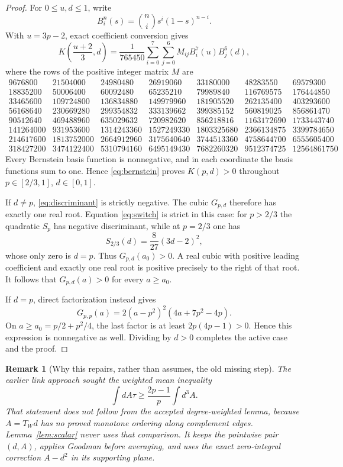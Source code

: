 \documentclass[11pt]{article}
\newtheorem{remark}[theorem]{Remark}
\begin{document}
\begin{proof}
For $0\leq u,d\leq1$, write
\[
 B_i^n(s)=\binom ni s^i(1-s)^{n-i}.
\]
With $u=3p-2$, exact coefficient conversion gives
\begin{equation}
 K\!\left(\frac{u+2}{3},d\right)
 =\frac1{765450}\sum_{i=0}^7\sum_{j=0}^6
 M_{ij}B_i^7(u)B_j^6(d),
 \label{eq:bernstein}
\end{equation}
where the rows of the positive integer matrix $M$ are
\[
\begin{array}{rrrrrrr}
9676800&21504000&24980480&26919060&33180000&48283550&69579300\\
18835200&50006400&60092480&65235210&79989840&116769575&176444850\\
33465600&109724800&136834880&149979960&181905520&262135400&403293600\\
56168640&230669280&299354832&333139662&399385152&560819025&856861470\\
90512640&469488960&635029632&720982620&856218816&1163172690&1733443740\\
141264000&931953600&1314243360&1527249330&1803325680&2366134875&3399784650\\
214617600&1813752000&2664912960&3175640640&3744513360&4758644700&6555605400\\
318427200&3474122400&5310794160&6495149430&7682260320&9512374725&12564861750
\end{array}
\]
Every Bernstein basis function is nonnegative, and in each coordinate the
basis functions sum to one.  Hence \eqref{eq:bernstein} proves
$K(p,d)>0$ throughout $p\in[2/3,1]$, $d\in[0,1]$.

If $d\ne p$, \eqref{eq:discriminant} is strictly negative.  The cubic
$G_{p,d}$ therefore has exactly one real root.  Equation \eqref{eq:switch}
is strict in this case: for $p>2/3$ the quadratic $S_p$ has negative
discriminant, while at $p=2/3$ one has
\[
 S_{2/3}(d)=\frac8{27}(3d-2)^2,
\]
whose only zero is $d=p$.  Thus $G_{p,d}(a_0)>0$.  A real cubic with positive
leading coefficient and exactly one real root is positive precisely to the
right of that root.  It follows that $G_{p,d}(a)>0$ for every $a\geq a_0$.

If $d=p$, direct factorization instead gives
\[
 G_{p,p}(a)=2(a-p^2)^2(4a+7p^2-4p).
\]
On $a\geq a_0=p/2+p^2/4$, the last factor is at least
$2p(4p-1)>0$.  Hence this expression is nonnegative as well.  Dividing by
$d>0$ completes the active case and the proof.
\end{proof}

\begin{remark}[Why this repairs, rather than assumes, the old missing step]
The earlier link approach sought the weighted mean inequality
\[
 \int dA\tau\geq\frac{2p-1}{p}\int d^3A.
\]
That statement does not follow from the accepted degree-weighted lemma,
because $A=T_Wd$ has no proved monotone ordering along complement edges.
Lemma~\ref{lem:scalar} never uses that comparison.  It keeps the pointwise
pair $(d,A)$, applies Goodman before averaging, and uses the exact
zero-integral correction $A-d^2$ in its supporting plane.
\end{remark}
\end{document}
